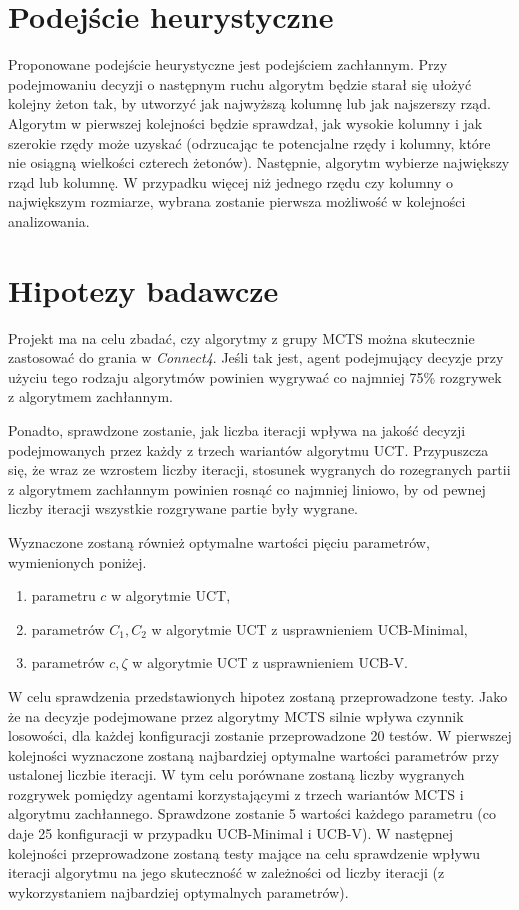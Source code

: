 \documentclass[a4paper,12pt]{article}
\let\oldsection\section
\renewcommand\section{\clearpage\oldsection}
\newcommand{\nazwagry}{\textit{Connect4}}
\begin{document}
\section{Podejście heurystyczne} \label{subsec:greedy}
Proponowane podejście heurystyczne jest podejściem zachłannym. Przy podejmowaniu decyzji o następnym ruchu algorytm będzie starał się ułożyć kolejny żeton tak, by utworzyć jak najwyższą kolumnę lub jak najszerszy rząd. Algorytm w pierwszej kolejności będzie sprawdzał, jak wysokie kolumny i jak szerokie rzędy może uzyskać (odrzucając te potencjalne rzędy i kolumny, które nie osiągną wielkości czterech żetonów). Następnie, algorytm wybierze największy rząd lub kolumnę. W przypadku więcej niż jednego rzędu czy kolumny o największym rozmiarze, wybrana zostanie pierwsza możliwość w kolejności analizowania.

\section{Hipotezy badawcze}
Projekt ma na celu zbadać, czy algorytmy z grupy MCTS można skutecznie zastosować do grania w \nazwagry. Jeśli tak jest, agent podejmujący decyzje przy użyciu tego rodzaju algorytmów powinien wygrywać co najmniej 75\% rozgrywek z algorytmem zachłannym.

Ponadto, sprawdzone zostanie, jak liczba iteracji wpływa na jakość decyzji podejmowanych przez każdy z trzech wariantów algorytmu UCT. Przypuszcza się, że wraz ze wzrostem liczby iteracji, stosunek wygranych do rozegranych partii z algorytmem zachłannym powinien rosnąć co najmniej liniowo, by od pewnej liczby iteracji wszystkie rozgrywane partie były wygrane.

Wyznaczone zostaną również optymalne wartości pięciu parametrów, wymienionych poniżej.
\begin{enumerate}
	\item parametru $c$ w algorytmie UCT,
	\item parametrów $C_1, C_2$ w algorytmie UCT z usprawnieniem UCB-Minimal,
	\item parametrów $c, \zeta$ w algorytmie UCT z usprawnieniem UCB-V.\\
\end{enumerate}

W celu sprawdzenia przedstawionych hipotez zostaną przeprowadzone testy. Jako że na decyzje podejmowane przez algorytmy MCTS silnie wpływa czynnik losowości, dla każdej konfiguracji zostanie przeprowadzone 20 testów. W pierwszej kolejności wyznaczone zostaną najbardziej optymalne wartości parametrów przy ustalonej liczbie iteracji. W tym celu porównane zostaną liczby wygranych rozgrywek pomiędzy agentami korzystającymi z trzech wariantów MCTS i algorytmu zachłannego. Sprawdzone zostanie 5 wartości każdego parametru (co daje 25 konfiguracji w przypadku UCB-Minimal i UCB-V). W następnej kolejności przeprowadzone zostaną testy mające na celu sprawdzenie wpływu iteracji algorytmu na jego skuteczność w zależności od liczby iteracji (z wykorzystaniem najbardziej optymalnych parametrów).
\end{document}
